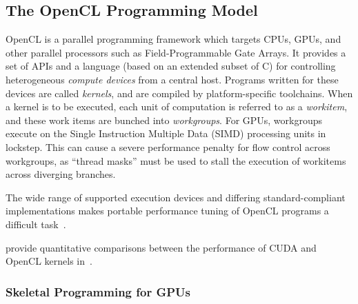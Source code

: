 \subsection{The OpenCL Programming Model}

OpenCL is a parallel programming framework which targets CPUs, GPUs,
and other parallel processors such as Field-Programmable Gate
Arrays. It provides a set of APIs and a language (based on an extended
subset of C) for controlling heterogeneous \emph{compute devices} from
a central host. Programs written for these devices are called
\emph{kernels}, and are compiled by platform-specific toolchains. When
a kernel is to be executed, each unit of computation is referred to as
a \emph{workitem}, and these work items are bunched into
\emph{workgroups}. For GPUs, workgroups execute on the Single
Instruction Multiple Data (SIMD) processing units in lockstep. This
can cause a severe performance penalty for flow control across
workgroups, as ``thread masks'' must be used to stall the execution of
workitems across diverging branches.

The wide range of supported execution devices and differing
standard-compliant implementations makes portable performance tuning
of OpenCL programs a difficult task~\cite{Rul2010}.


\citeauthor{Komatsu2010} provide quantitative comparisons between the
performance of CUDA and OpenCL kernels
in~.



\subsubsection{Skeletal Programming for GPUs}

